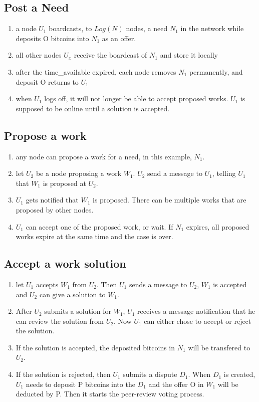 \documentclass[12pt]{article}
\begin{document}
\subsection{Post a Need}
\begin{enumerate}
	\item a node $U_1$ boardcasts, to $Log(N)$ nodes, a need $N_1$ in the network while deposits O bitcoins into $N_1$ as an offer.
	\item all other nodes $U_x$ receive the boardcast of $N_1$ and store it locally
	\item after the time\_available expired, each node removes $N_1$ permanently, and deposit O returns to $U_1$
	\item when $U_1$ logs off, it will not longer be able to accept proposed works. $U_1$ is supposed to be online until a solution is accepted.  
\end{enumerate}

\subsection{Propose a work}
\begin{enumerate}
	\item any node can propose a work for a need, in this example, $N_1$. 
	\item let $U_2$ be a node proposing a work $W_1$. $U_2$ send a message to $U_1$, telling $U_1$ that $W_1$ is proposed at $U_2$.
	\item $U_1$ gets notified that $W_1$ is proposed. There can be multiple works that are proposed by other nodes. 
	\item $U_1$ can accept one of the proposed work, or wait. If $N_1$ expires, all proposed works expire at the same time and the case is over.
\end{enumerate}

\subsection{Accept a work solution}
\begin{enumerate}
	\item let $U_1$ accepts $W_1$ from $U_2$. Then $U_1$ sends a message to $U_2$, $W_1$ is accepted and $U_2$ can give a solution to $W_1$.
	\item After $U_2$ submits a solution for $W_1$, $U_1$ receives a message notification that he can review the solution from $U_2$. Now $U_1$ can either chose to accept or reject the solution.
	\item If the solution is accepted, the deposited bitcoins in $N_1$ will be transfered to $U_2$.
	\item If the solution is rejected, then $U_1$ submits a dispute $D_1$. When $D_1$ is created, $U_1$ needs to deposit P bitcoins into the $D_1$ and the offer O in $W_1$ will be deducted by P. Then it starts the peer-review voting process.
\end{enumerate}
\end{document}
